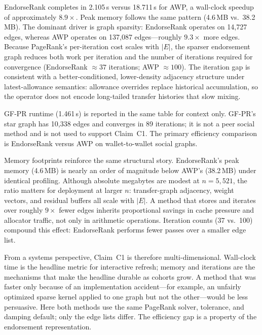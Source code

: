 

EndorseRank completes in 2.105\,s versus 18.711\,s for AWP, a wall-clock speedup of approximately $8.9\times$. Peak memory follows the same pattern (4.6\,MB vs.\ 38.2\,MB). The dominant driver is graph sparsity: EndorseRank operates on 14{,}727 edges, whereas AWP operates on 137{,}087 edges---roughly $9.3\times$ more edges. Because PageRank's per-iteration cost scales with $|E|$, the sparser endorsement graph reduces both work per iteration and the number of iterations required for convergence (EndorseRank $\approx 37$ iterations; AWP $\approx 100$). The iteration gap is consistent with a better-conditioned, lower-density adjacency structure under latest-allowance semantics: allowance overrides replace historical accumulation, so the operator does not encode long-tailed transfer histories that slow mixing.

GF-PR runtime (1.461\,s) is reported in the same table for context only. GF-PR's star graph has 10{,}338 edges and converges in 89 iterations; it is not a peer social method and is not used to support Claim~C1. The primary efficiency comparison is EndorseRank versus AWP on wallet-to-wallet social graphs.

Memory footprints reinforce the same structural story. EndorseRank's peak memory (4.6\,MB) is nearly an order of magnitude below AWP's (38.2\,MB) under identical profiling. Although absolute megabytes are modest at $n=5{,}521$, the ratio matters for deployment at larger $n$: transfer-graph adjacency, weight vectors, and residual buffers all scale with $|E|$. A method that stores and iterates over roughly $9\times$ fewer edges inherits proportional savings in cache pressure and allocator traffic, not only in arithmetic operations. Iteration counts (37 vs.\ 100) compound this effect: EndorseRank performs fewer passes over a smaller edge list.

From a systems perspective, Claim~C1 is therefore multi-dimensional. Wall-clock time is the headline metric for interactive refresh; memory and iterations are the mechanisms that make the headline durable as cohorts grow. A method that was faster only because of an implementation accident---for example, an unfairly optimized sparse kernel applied to one graph but not the other---would be less persuasive. Here both methods use the same PageRank solver, tolerance, and damping default; only the edge lists differ. The efficiency gap is a property of the endorsement representation.

